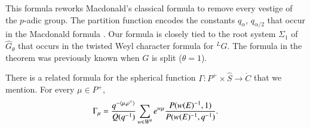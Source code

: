 This formula reworks Macdonald's classical formula  to remove every vestige
of the $p$-adic group.
The partition function
encodes the constants $q_\alpha$, $q_{\alpha/2}$ that occur in the Macdonald formula \cite{macdonaldspherical}.  
Our formula is closely
tied to the root system $\Sigma_1$ of $\hat G_\theta$
that occurs in the twisted Weyl character formula for ${}^LG$.  
The formula in the theorem was previously known when $G$ is split  ($\theta=1$).

There is a related formula for the spherical function $\Gamma:P^+\times\hat S\to\ring{C}$ that we mention.
For every $\mu\in P^+$, 
\begin{equation} 
\Gamma_\mu = 
\frac{q^{-\langle{\mu,\rho^\vee}\rangle}}{ Q(q^{-1})} \sum_{w\in W^\theta} e^{w\mu} \frac{P(w(E)^{-1},1)}{P(w(E)^{-1},q^{-1})}.
\end{equation}


